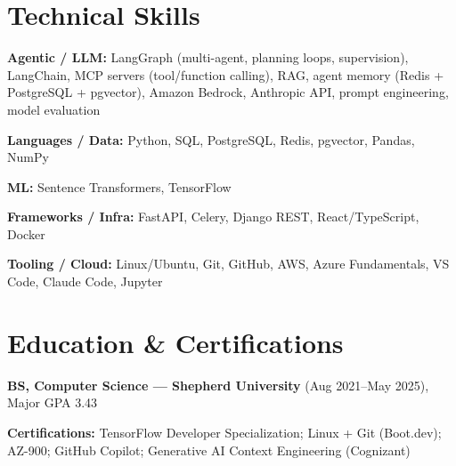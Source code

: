 \documentclass[10pt]{article}
\begin{document}
\section*{Technical Skills}
\noindent \textbf{Agentic / LLM:} LangGraph (multi-agent, planning loops, supervision), LangChain, MCP servers (tool/function calling), RAG, agent memory (Redis + PostgreSQL + pgvector), Amazon Bedrock, Anthropic API, prompt engineering, model evaluation\par
\noindent \textbf{Languages / Data:} Python, SQL, PostgreSQL, Redis, pgvector, Pandas, NumPy\par
\noindent \textbf{ML:} Sentence Transformers, TensorFlow\par
\noindent \textbf{Frameworks / Infra:} FastAPI, Celery, Django REST, React/TypeScript, Docker\par
\noindent \textbf{Tooling / Cloud:} Linux/Ubuntu, Git, GitHub, AWS, Azure Fundamentals, VS Code, Claude Code, Jupyter\par
\section*{Education \& Certifications}
\noindent \textbf{BS, Computer Science — Shepherd University} (Aug 2021–May 2025), Major GPA 3.43\par
\noindent \textbf{Certifications:} TensorFlow Developer Specialization; Linux + Git (Boot.dev); AZ-900; GitHub Copilot; Generative AI Context Engineering (Cognizant)\par
\end{document}
